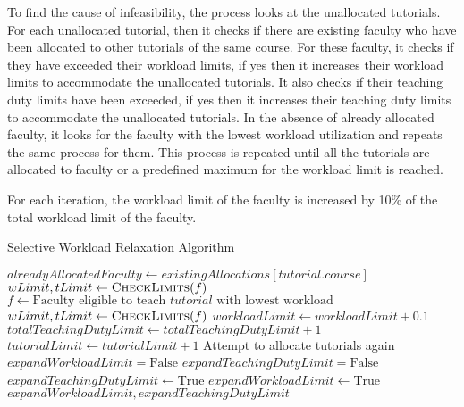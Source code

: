 To find the cause of infeasibility, the process looks at the unallocated tutorials. For each unallocated tutorial, then it checks if there are existing faculty who have been allocated to other tutorials of the same course. For these faculty, it checks if they have exceeded their workload limits, if yes then it increases their workload limits to accommodate the unallocated tutorials. It also checks if their teaching duty limits have been exceeded, if yes then it increases their teaching duty limits to accommodate the unallocated tutorials. In the absence of already allocated faculty, it looks for the faculty with the lowest workload utilization and repeats the same process for them. This process is repeated until all the tutorials are allocated to faculty or a predefined maximum for the workload limit is reached.

For each iteration, the workload limit of the faculty is increased by 10\% of the total workload limit of the faculty.

\begin{algorithm}[H]
  \caption*{Selective Workload Relaxation Algorithm}
  \begin{algorithmic}
    \State $alreadyAllocatedFaculty \gets existingAllocations[tutorial.course]$
    \State $wLimit, tLimit \gets \Call{CheckLimits}{f}$
    \EndFor
    \Else
    \State $f \gets \text{Faculty eligible to teach $tutorial$ with lowest workload}$
    \State $wLimit, tLimit \gets \Call{CheckLimits}{f}$
    \EndIf
    \EndFor
    \State $workloadLimit \gets workloadLimit + 0.1$
    \EndIf
    \State $totalTeachingDutyLimit \gets totalTeachingDutyLimit + 1$
    \State $tutorialLimit \gets tutorialLimit + 1$
    \EndIf
    \State Attempt to allocate tutorials again
    \EndWhile
    \EndProcedure
    \\
    \State $expandWorkloadLimit = \text{False}$
    \State $expandTeachingDutyLimit = \text{False}$
    \State $expandTeachingDutyLimit \gets \text{True}$
    \EndIf
    \State $expandWorkloadLimit \gets \text{True}$
    \EndIf
    \State \Return $expandWorkloadLimit, expandTeachingDutyLimit$
    \EndProcedure
  \end{algorithmic}
\end{algorithm}

